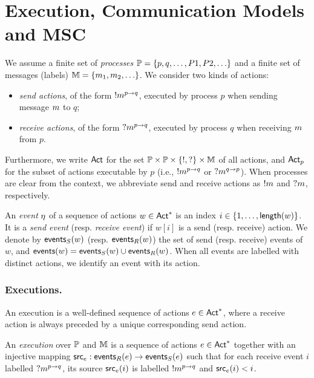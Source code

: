 \section{Execution, Communication Models and MSC}
We assume a finite set of \emph{processes} 
$\mathbb{P}=\{p,q,\ldots,P1,P2,\ldots\}$ and a finite set of 
messages (labels) $\mathbb{M}=\{m_1,m_2,\ldots\}$.  
We consider two kinds of actions:  
\begin{itemize}
	\item \emph{send actions}, of the form $!m^{p\to q}$, 
	executed by process $p$ when sending message $m$ to $q$;  
	\item \emph{receive actions}, of the form $?m^{p\to q}$, 
	executed by process $q$ when receiving $m$ from $p$.  
\end{itemize}

Furthermore, we write $\mathsf{Act}$ for the set $\mathbb{P} \times \mathbb{P} \times \{!,?\} \times \mathbb{M}$  
of all actions, and $\mathsf{Act}_{p}$ for the subset of actions executable by $p$ 
(i.e., $!m^{p\to q}$ or $?m^{q\to p}$).  
When processes are clear from the context, we abbreviate 
send and receive actions as $!m$ and $?m$, respectively.  

An \emph{event} $\eta$ of a sequence of actions $w \in \mathsf{Act}^*$  
is an index $i \in \{1,\ldots,\mathsf{length}(w)\}$.  
It is a \emph{send event} (resp. \emph{receive event}) if $w[i]$  
is a send (resp. receive) action.  
We denote by $\mathsf{events}_S(w)$ (resp. $\mathsf{events}_R(w)$)  
the set of send (resp. receive) events of $w$, and  
$\mathsf{events}(w) = \mathsf{events}_S(w) \cup \mathsf{events}_R(w)$.  
When all events are labelled with distinct actions, 
we identify an event with its action.  

\subsubsection*{Executions.}
An execution is a well-defined sequence of actions $e\in\mathsf{Act}^*$, where a
receive action is always preceded by a unique corresponding send action. %

\bigskip

\begin{definition}[Execution]\label{def:execution}
An \emph{execution} over $\mathbb{P}$ and $\mathbb{M}$ is a sequence 
of actions $e \in \mathsf{Act}^*$ together with an injective mapping 
$\mathsf{src}_{e} : \mathsf{events}_R(e) \to \mathsf{events}_S(e)$  
such that for each receive event $i$ labelled $?m^{p\to q}$,  
its source $\mathsf{src}_{e}(i)$ is labelled $!m^{p\to q}$ and  
$\mathsf{src}_{e}(i) < i$.  
\end{definition}

